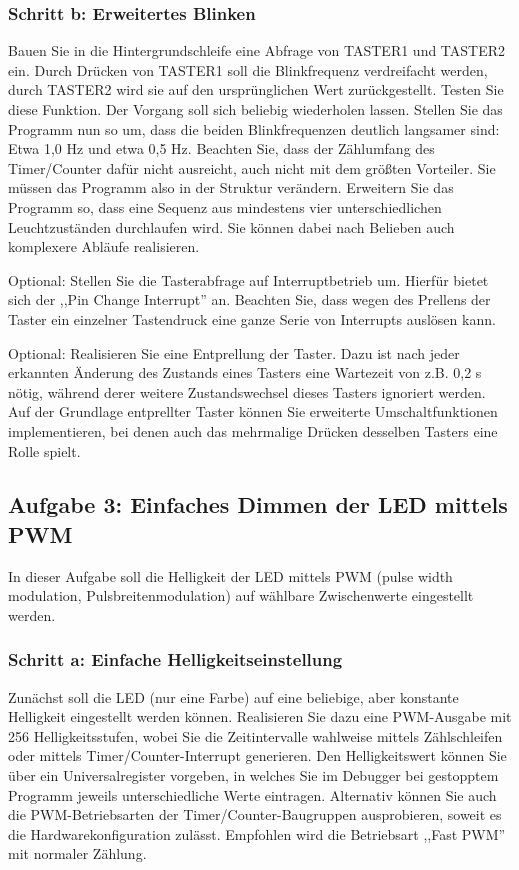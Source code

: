\documentclass[a4paper,12pt,titlepage]{scrartcl}
\begin{document}
\subsubsection*{Schritt b: Erweitertes Blinken}
Bauen Sie in die Hintergrundschleife eine Abfrage von TASTER1 und TASTER2 ein. Durch Drücken von TASTER1 soll die Blinkfrequenz verdreifacht werden, durch TASTER2 wird sie auf den ursprünglichen Wert zurückgestellt.
Testen Sie diese Funktion. Der Vorgang soll sich beliebig wiederholen lassen.
Stellen Sie das Programm nun so um, dass die beiden Blinkfrequenzen deutlich langsamer sind: Etwa 1,0 Hz und etwa 0,5 Hz. Beachten Sie, dass der Zählumfang des Timer/Counter dafür nicht ausreicht, auch nicht mit dem größten Vorteiler. Sie müssen das Programm also in der Struktur verändern.
Erweitern Sie das Programm so, dass eine Sequenz aus mindestens vier unterschiedlichen Leuchtzuständen durchlaufen wird. Sie können dabei nach Belieben auch komplexere Abläufe realisieren.

Optional: Stellen Sie die Tasterabfrage auf Interruptbetrieb um. Hierfür bietet sich der ,,Pin Change Interrupt'' an. Beachten Sie, dass wegen des Prellens der Taster ein einzelner Tastendruck eine ganze Serie von Interrupts auslösen kann.

Optional: Realisieren Sie eine Entprellung der Taster. Dazu ist nach jeder erkannten Änderung des Zustands eines Tasters eine Wartezeit von z.B. 0,2 s nötig, während derer weitere Zustandswechsel dieses Tasters ignoriert werden. Auf der Grundlage entprellter Taster können Sie erweiterte Umschaltfunktionen implementieren, bei denen auch das mehrmalige Drücken desselben Tasters eine Rolle spielt.

\subsection*{Aufgabe 3: Einfaches Dimmen der LED mittels PWM}
In dieser Aufgabe soll die Helligkeit der LED mittels PWM (pulse width modulation, Pulsbreitenmodulation) auf wählbare Zwischenwerte eingestellt werden.

\subsubsection*{Schritt a: Einfache Helligkeitseinstellung}
Zunächst soll die LED (nur eine Farbe) auf eine beliebige, aber konstante Helligkeit eingestellt werden können. Realisieren Sie dazu eine PWM-Ausgabe mit 256 Helligkeitsstufen, wobei Sie die Zeitintervalle wahlweise mittels Zählschleifen oder mittels Timer/Counter-Interrupt generieren. Den Helligkeitswert können Sie über ein Universalregister vorgeben, in welches Sie im Debugger bei gestopptem Programm jeweils unterschiedliche Werte eintragen.
Alternativ können Sie auch die PWM-Betriebsarten der Timer/Counter-Baugruppen ausprobieren, soweit es die Hardwarekonfiguration zulässt. Empfohlen wird die Betriebsart ,,Fast PWM'' mit normaler Zählung.
\end{document}
